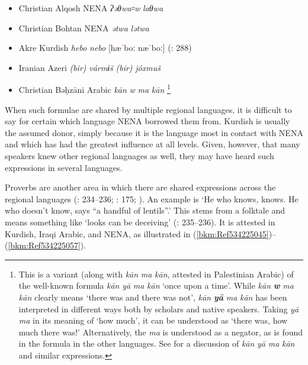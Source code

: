\documentclass[output=paper]{langsci/langscibook}
\begin{document}
\begin{itemize}

\item[] Christian Alqosh NENA   \textit{ʔəθwa꞊w} \textit{laθwa} \citep[268]{Coghill2009}

\item[] Christian Bohtan NENA   \textit{ətwa} \textit{lətwa} \citep{Fox2009}

\item[] Akre Kurdish   \textit{hebo} \textit{nebo} [hæ\textcolor{red}{ˈ}boː næ\textcolor{red}{ˈ}boː] (\citealt{MacKenzie1962}: 288) 

\item[] Iranian Azeri   \textit{(bir)} \textit{vármɨš} \textit{(bir)} \textit{jóxmuš} \citep[175]{Garbell1965}

\item[] Christian Bəḥzāni Arabic   \textit{kān} \textit{w} \textit{ma} \textit{kān} \citep[404]{Jastrow1981}\footnote{This is a variant (along with \textit{kān} \textit{ma} \textit{kān}, attested in Palestinian Arabic) of the well-known formula \textit{kān} \textit{yā} \textit{ma} \textit{kān} ‘once upon a time’. While \textit{kān} \textbf{\textit{w}} \textit{ma} \textit{kān} clearly means ‘there was and there was not’, \textit{kān} \textbf{\textit{yā}} \textit{ma} \textit{kān} has been interpreted in different ways both by scholars and native speakers. Taking \textit{yā} \textit{ma} in its meaning of ‘how much’, it can be understood as ‘there was, how much there was!’ Alternatively, the \textit{ma} is understood as a negator, as is found in the formula in the other languages. See \citet{Lentin1995} for a discussion of \textit{kān} \textit{yā} \textit{ma} \textit{kān} and similar expressions.}
\end{itemize}

When such formulae are shared by multiple regional languages, it is difficult to say for certain which language NENA borrowed them from. Kurdish is usually the assumed donor, simply because it is the language most in contact with NENA and which has had the greatest influence at all levels. Given, however, that many speakers knew other regional languages as well, they may have heard such expressions in several languages.

Proverbs are another area in which there are shared expressions across the regional languages (\citealt{Chyet1995}: 234–236; \citealt{Garbell1965}: 175; \citealt{Segal1955}). An example is ‘He who knows, knows. He who doesn’t know, says “a handful of lentils”.’ This stems from a folktale and means something like ‘looks can be deceiving’ (\citealt{Chyet1995}: 235–236). It is attested in Kurdish, Iraqi Arabic, and NENA, as illustrated in (\ref{bkm:Ref534225045})–(\ref{bkm:Ref534225057}).
\end{document}
